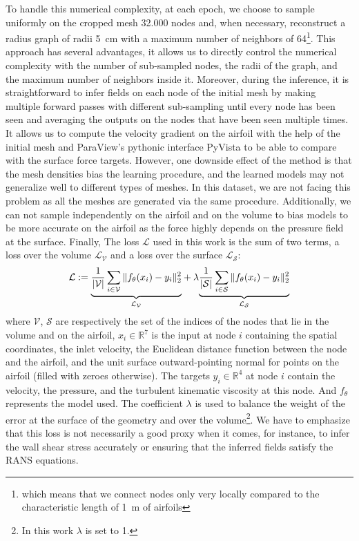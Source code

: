 To handle this numerical complexity, at each epoch, we choose to sample uniformly on the cropped mesh \SI{32.000}{} nodes and, when necessary, reconstruct a radius graph of radii \SI{5}{\centi\meter} with a maximum number of neighbors of 64\footnote{which means that we connect nodes only very locally compared to the characteristic length of \SI{1}{\meter} of airfoils}. This approach has several advantages, it allows us to directly control the numerical complexity with the number of sub-sampled nodes, the radii of the graph, and the maximum number of neighbors inside it. Moreover, during the inference, it is straightforward to infer fields on each node of the initial mesh by making multiple forward passes with different sub-sampling until every node has been seen and averaging the outputs on the nodes that have been seen multiple times. It allows us to compute the velocity gradient on the airfoil with the help of the initial mesh and ParaView's pythonic interface PyVista \cite{pyvista} to be able to compare with the surface force targets. However, one downside effect of the method is that the mesh densities bias the learning procedure, and the learned models may not generalize well to different types of meshes. In this dataset, we are not facing this problem as all the meshes are generated via the same procedure. Additionally, we can not sample independently on the airfoil and on the volume to bias models to be more accurate on the airfoil as the force highly depends on the pressure field at the surface. 
Finally, The loss $\mathcal{L}$ used in this work is the sum of two terms, a loss over the volume $\mathcal{L}_{\mathcal{V}}$ and a loss over the surface $\mathcal{L}_{\mathcal{S}}$:
\begin{equation}\label{eq:global_loss}
	\centering
	\mathcal{L}:={\underbrace{\frac{1}{|\mathcal{V}|}\sum_{i\in \mathcal{V}} \|f_\theta(x_i) - y_i\|_2^2}_{\text{$\mathcal{L}_\mathcal{V}$}}}+  \lambda{\underbrace{\frac{1}{|\mathcal{S}|}\sum_{i\in \mathcal{S}} \|f_\theta(x_i) - y_i\|_2^2}_{\text{$\mathcal{L}_\mathcal{S}$}}}
\end{equation}
where $\mathcal{V}$, $\mathcal{S}$ are respectively the set of the indices of the nodes that lie in the volume and on the airfoil, $x_i \in \mathbb{R}^{7}$ is the input at node $i$ containing the spatial coordinates, the inlet velocity, the Euclidean distance function between the node and the airfoil, and the unit surface outward-pointing normal for points on the airfoil (filled with zeroes otherwise). The targets $y_i \in \mathbb{R}^{4}$ at node $i$ contain the velocity, the pressure, and the turbulent kinematic viscosity at this node. And $f_\theta$ represents the model used. The coefficient $\lambda$ is used to balance the weight of the error at the surface of the geometry and over the volume\footnote{In this work $\lambda$ is set to 1.}. We have to emphasize that this loss is not necessarily a good proxy when it comes, for instance, to infer the wall shear stress accurately or ensuring that the inferred fields satisfy the RANS equations.

